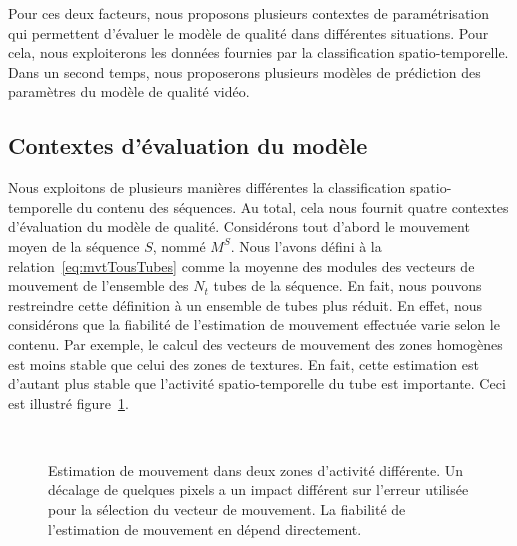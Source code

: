 Pour ces deux facteurs, nous proposons plusieurs contextes de paramétrisation qui permettent d'évaluer le modèle de qualité dans différentes situations. Pour cela, nous exploiterons les données fournies par la classification spatio-temporelle. Dans un second temps, nous proposerons plusieurs modèles de prédiction des paramètres du modèle de qualité vidéo. %


\subsection{Contextes d'évaluation du modèle}
Nous exploitons de plusieurs manières différentes la classification spatio-temporelle du contenu des séquences. Au total, cela nous fournit quatre contextes d'évaluation du modèle de qualité. Considérons tout d'abord le mouvement moyen de la séquence $S$, nommé $M^S$. Nous l'avons défini à la relation~\ref{eq:mvtTousTubes} comme la moyenne des modules des vecteurs de mouvement de l'ensemble des $N_t$ tubes de la séquence. En fait, nous pouvons restreindre cette définition à un ensemble de tubes plus réduit. En effet, nous considérons que la fiabilité de l'estimation de mouvement effectuée varie selon le contenu. Par exemple, le calcul des vecteurs de mouvement des zones homogènes est moins stable que celui des zones de textures. En fait, cette estimation est d'autant plus stable que l'activité spatio-temporelle du tube est importante. Ceci est illustré figure~\ref{fig:tubeZones}.

\begin{figure}[htbp]
	\centering
	\\
	\caption{Estimation de mouvement dans deux zones d'activité différente. Un décalage de quelques pixels a un impact différent sur l'erreur utilisée pour la sélection du vecteur de mouvement. La fiabilité de l'estimation de mouvement en dépend directement.}
	\label{fig:tubeZones}
\end{figure}

